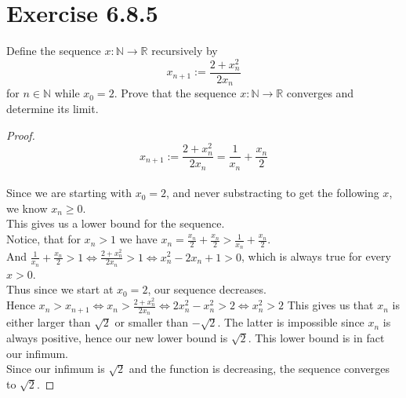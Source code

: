 \documentclass{article}
\newcommand{\N}{\mathbb{N}}
\newcommand{\R}{\mathbb{R}}
\theoremstyle{mytheoremstyle}
\theoremstyle{mytheoremstyle}
\theoremstyle{myproblemstyle}
\begin{document}
    \section{Exercise 6.8.5}
    \begin{problem}
        Define the sequence $x: \N \to \R$ recursively by
        $$x_{n+1} := \frac{2+x_n^2}{2x_n}$$
        for $n \in \N$ while $x_0 = 2$. Prove that the sequence $x: \N \to \R$ converges and determine its limit.
    \end{problem}
    \begin{proof}
        $$x_{n + 1} := \frac{2 + x_n ^2}{2x_n} = \frac{1}{x_n} + \frac{x_n}{2}$$ \\
        Since we are starting with $x_0 = 2$, and never substracting to get the following $x$, we know $x_n \geq 0$.\\
        This gives us a lower bound for the sequence.\\
        Notice, that for $x_n > 1$ we have $x_n = \frac{x_n}{2} + \frac{x_n}{2} > \frac{1}{x_n} + \frac{x_n}{2}$.\\
        And $\frac{1}{x_n} + \frac{x_n}{2} > 1 \iff \frac{2 + x_n ^2}{2x_n} > 1 \iff x_n ^2 - 2x_n + 1 > 0$, which is always true for every $x > 0$.\\
        Thus since we start at $x_0 = 2$, our sequence decreases. \\
        Hence $x_n > x_{n + 1} \iff x_n > \frac{2 + x_n ^2}{2x_n} \iff 2x_n ^2 - x_n ^2 > 2 \iff x_n ^2 > 2$
        This gives us that $x_n$ is either larger than $\sqrt{2}$ or smaller than $-\sqrt{2}$. The latter is impossible
        since $x_n$ is always positive, hence our new lower bound is $\sqrt{2}$.
        This lower bound is in fact our infimum. \\
        Since our infimum is $\sqrt{2}$ and the function is decreasing,
        the sequence converges to $\sqrt{2}$.
    \end{proof}
\end{document}

